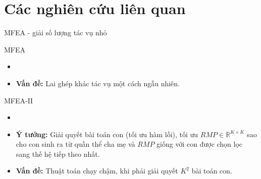 \section{Các nghiên cứu liên quan}
\begin{frame}{MFEA - giải số lượng tác vụ nhỏ}
    \begin{block}{MFEA}
        \begin{itemize}
            \item {}
            \item \textbf{Vấn đề:} Lai ghép khác tác vụ một cách ngẫu nhiên.
        \end{itemize}
    \end{block}
    \begin{block}{MFEA-II}
        \begin{itemize}
            \item {}
            \item \textbf{Ý tưởng:} Giải quyết bài toán con (tối ưu hàm lồi), tối ưu $RMP \in \mathbb{R}^{K \times K}$ sao cho con sinh ra từ quần thể cha mẹ và $RMP$ giống với con được chọn lọc sang thế hệ tiếp theo nhất.
            \item \textbf{Vấn đề:} Thuật toán chạy chậm, khi phải giải quyết $K^2$ bài toán con.
        \end{itemize}
    \end{block}
\end{frame}


